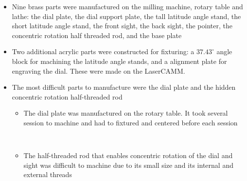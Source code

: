 \documentclass[final]{beamer}
\begin{document}
\begin{frame}
\begin{columns}[t]
\begin{column}[t]{0.24 \textwidth}
\begin{itemize}
\item Nine brass parts were manufactured on the milling machine,
  rotary table and lathe: the dial plate, the dial support plate, the
  tall latitude angle stand, the short latitude angle stand, the front
  sight, the back sight, the pointer, the concentric rotation half
  threaded rod, and the base plate
\item Two additional acrylic parts were constructed for fixturing:
  a $37.43^\circ$ angle block for machining the latitude angle stands,
  and a alignment plate for engraving the dial. These were made on the
  LaserCAMM.
\item The most difficult parts to manufacture were the dial plate and the 
hidden concentric rotation half-threaded rod 
\begin{itemize}
\item The dial plate was manufactured on the rotary table. It took
several session to machine and had to fixtured and centered 
before each session
\begin{center}
\\
\end{center}
\item The half-threaded rod that enables concentric rotation of 
the dial and sight was difficult to machine due to its small size
and its internal and external threads
\begin{center}

\end{center}
\end{itemize}
\end{itemize}
\end{column}
\end{columns}
\end{frame}
\end{document}
